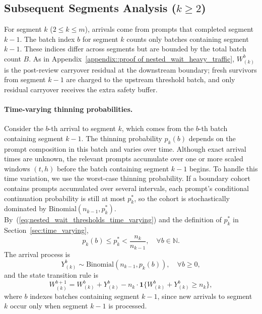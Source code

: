 \subsection{Subsequent Segments Analysis ($k \geq 2$)}

For segment $k$ ($2\leq k\leq m$), arrivals come from prompts that completed segment $k-1$. The batch index $b$ for segment $k$ counts only batches containing segment $k-1$. These indices differ across segments but are bounded by the total batch count $B$. As in Appendix~\ref{appendix::proof of nested_wait_heavy_traffic}, \(W^b_{(k)}\) is the post-review carryover residual at the downstream boundary; fresh survivors from segment \(k-1\) are charged to the upstream threshold batch, and only residual carryover receives the extra safety buffer.

\paragraph{Time-varying thinning probabilities.} Consider the $b$-th arrival to segment $k$, which comes from the $b$-th batch containing segment $k-1$. The thinning probability $p_k(b)$ depends on the prompt composition in this batch and varies over time. Although exact arrival times are unknown, the relevant prompts accumulate over one or more scaled windows \((t,h)\) before the batch containing segment \(k-1\) begins. To handle this time variation, we use the worst-case thinning probability. If a boundary cohort contains prompts accumulated over several intervals, each prompt's conditional continuation probability is still at most \(p_k^*\), so the cohort is stochastically dominated by \(\mathrm{Binomial}(n_{k-1},p_k^*)\). By~(\ref{eq:nested_wait_thresholds_time_varying}) and the definition of \(p_k^*\) in Section~\ref{sec:time_varying},
$$p_k(b) \leq p_k^* < \frac{n_k}{n_{k-1}}, \quad \forall b \in \mathbb{N}.$$
The arrival process is
$$Y_{(k)}^b \sim \text{Binomial}(n_{k-1},p_k(b)),\quad \forall b\geq 0,$$
and the state transition rule is
$$W_{(k)}^{b+1} = W_{(k)}^{b} + Y_{(k)}^{b} - n_k \cdot\mathbf{1}\{ W_{(k)}^{b} + Y_{(k)}^{b}\geq n_k \}, $$
where $b$ indexes batches containing segment $k-1$, since new arrivals to segment $k$ occur only when segment $k-1$ is processed.

